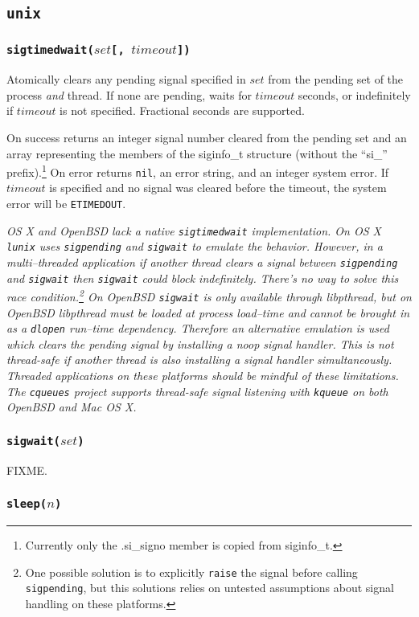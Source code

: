 \documentclass[11pt, oneside]{memoir}
\newcommand*{\lunix}[0]{\texttt{lunix}\xspace}
\newcommand*{\cqueues}[0]{\texttt{cqueues}\xspace}
\newcommand*{\nil}[0]{\texttt{nil}\xspace}
\newcommand*{\syscall}[1]{\texttt{#1}\xspace}
\newcommand*{\fn}[1]{\texttt{#1}\xspace}
\newcounter{toccols}
\newenvironment{Module}[1]{
	\subsection{\texttt{#1}}
	\addtocontents{toc}{
		\protect\begin{multicols}{\value{toccols}}
	}
}{
	\addtocontents{toc}{\protect\end{multicols}}
}
\begin{document}
\begin{Module}{unix}
\subsubsection[\fn{sigtimedwait}]{\fn{sigtimedwait($set$[, $timeout$])}}

Atomically clears any pending signal specified in $set$ from the pending set of the process \emph{and} thread. If none are pending, waits for $timeout$ seconds, or indefinitely if $timeout$ is not specified. Fractional seconds are supported.

On success returns an integer signal number cleared from the pending set and an array representing the members of the siginfo\_t structure (without the ``si\_'' prefix).\footnote{Currently only the .si\_signo member is copied from siginfo\_t.} On error returns \nil, an error string, and an integer system error. If $timeout$ is specified and no signal was cleared before the timeout, the system error will be \texttt{ETIMEDOUT}.

\emph{OS X and OpenBSD lack a native \syscall{sigtimedwait} implementation. On OS X \lunix uses \syscall{sigpending} and \syscall{sigwait} to emulate the behavior. However, in a multi--threaded application if another thread clears a signal between \syscall{sigpending} and \syscall{sigwait} then \syscall{sigwait} could block indefinitely. There's no way to solve this race condition.\footnote{One possible solution is to explicitly \syscall{raise} the signal before calling \syscall{sigpending}, but this solutions relies on untested assumptions about signal handling on these platforms.} On OpenBSD \syscall{sigwait} is only available through libpthread, but on OpenBSD libpthread must be loaded at process load--time and cannot be brought in as a \syscall{dlopen} run--time dependency. Therefore an alternative emulation is used which clears the pending signal by installing a noop signal handler. This is not thread-safe if another thread is also installing a signal handler simultaneously. Threaded applications on these platforms should be mindful of these limitations. The \cqueues project supports thread-safe signal listening with \syscall{kqueue} on both OpenBSD and Mac OS X.}

\subsubsection[\fn{sigwait}]{\fn{sigwait($set$)}}

FIXME.

\subsubsection[\fn{sleep}]{\fn{sleep($n$)}}


\end{Module}
\end{document}
